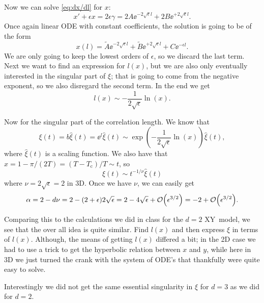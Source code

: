 \documentclass[11pt,letter, swedish, english
]{article}
\newcommand{\Tc}{\ensuremath{T_{\text{c}}}}
\begin{document}
Now we can solve \eqref{eq:dx/dl} for $x$:
\begin{equation}
x' +\epsilon x = 2\epsilon\gamma 
= 2A\ee^{-2\sqrt{\epsilon}l} + 2B\ee^{+2\sqrt{\epsilon}l}.
\end{equation}
Once again linear ODE with constant coefficients, the solution is going
to be of the form
\begin{equation}
x(l) = \tilde{A}\ee^{-2\sqrt{\epsilon}l} 
+ \tilde{B}\ee^{+2\sqrt{\epsilon}l} 
+ C\ee^{-\epsilon l}.
\end{equation}
We are only going to keep the lowest orders of $\epsilon$, so we
discard the last term. Next we want to find an expression for $l(x)$,
but we are also only eventually interested in the singular part of
$\xi$; that is going to come from the negative exponent, so we also
disregard the second term. In the end we get
\begin{equation}
l(x) \sim -\frac{1}{2\sqrt{\epsilon}} \ln(x).
\end{equation}


Now for the singular part of the correlation length. We know that
\begin{equation}
\xi(t) = b\hat\xi(t) = \ee^l\hat\xi(t)
\sim \exp(-\frac{1}{2\sqrt{\epsilon}} \ln(x))\hat\xi(t),
\end{equation}
where $\hat\xi(t)$ is a scaling function. 
We also have that $x=1-\pi/(2T) = (T-\Tc)/T \sim t$, so
\begin{equation}
\xi(t) 
\sim t^{-1/\nu}\hat\xi(t)
\end{equation}
where $\nu= 2\sqrt{\epsilon} = 2$ in 3D. 
Once we have $\nu$, we can easily get 
\begin{equation}
\alpha = 2-d\nu = 2 - (2+\epsilon)2\sqrt{\epsilon}
= 2 -4\sqrt{\epsilon} +\order{\epsilon^{3/2}} 
= -2+\order{\epsilon^{3/2}}.
\end{equation}

Comparing this to the calculations we did in class for the $d=2$
XY~model, we see that the over all idea is quite similar. Find $l(x)$
and then express $\xi$ in terms of $l(x)$. Although, the means of
getting $l(x)$ differed a bit; in the 2D case we had to use a trick to
get the hyperbolic relation between $x$ and $y$, while here in 3D we
just turned the crank with the system of ODE's that thankfully were
quite easy to solve. 

Interestingly we did not get the same essential singularity in $\xi$
for $d=3$ as we did for $d=2$. 
\end{document}

